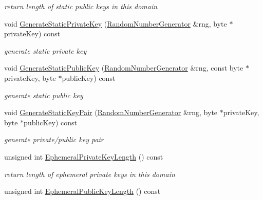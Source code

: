 \begin{DoxyCompactItemize}
\begin{DoxyCompactList}\small\item\em return length of static public keys in this domain \item\end{DoxyCompactList}\item 
void \hyperlink{class_d_h2_a05de579e63f552a103208bd7fdd23440}{GenerateStaticPrivateKey} (\hyperlink{class_random_number_generator}{RandomNumberGenerator} \&rng, byte $\ast$privateKey) const 
\begin{DoxyCompactList}\small\item\em generate static private key \item\end{DoxyCompactList}\item 
void \hyperlink{class_d_h2_a7151a0d3e0ab520aef0b61c70f59a50a}{GenerateStaticPublicKey} (\hyperlink{class_random_number_generator}{RandomNumberGenerator} \&rng, const byte $\ast$privateKey, byte $\ast$publicKey) const 
\begin{DoxyCompactList}\small\item\em generate static public key \item\end{DoxyCompactList}\item 
void \hyperlink{class_d_h2_aa4a447f81fcdcc656fe4fc5b6e99dc2e}{GenerateStaticKeyPair} (\hyperlink{class_random_number_generator}{RandomNumberGenerator} \&rng, byte $\ast$privateKey, byte $\ast$publicKey) const 
\begin{DoxyCompactList}\small\item\em generate private/public key pair \item\end{DoxyCompactList}\item 
\hypertarget{class_d_h2_adf142bd312b462c1fb1c8c2078fae3fc}{
unsigned int \hyperlink{class_d_h2_adf142bd312b462c1fb1c8c2078fae3fc}{EphemeralPrivateKeyLength} () const }
\label{class_d_h2_adf142bd312b462c1fb1c8c2078fae3fc}

\begin{DoxyCompactList}\small\item\em return length of ephemeral private keys in this domain \item\end{DoxyCompactList}\item 
\hypertarget{class_d_h2_adf9a6b522bd06c40254ceffab14e429c}{
unsigned int \hyperlink{class_d_h2_adf9a6b522bd06c40254ceffab14e429c}{EphemeralPublicKeyLength} () const }
\label{class_d_h2_adf9a6b522bd06c40254ceffab14e429c}


\end{DoxyCompactItemize}
